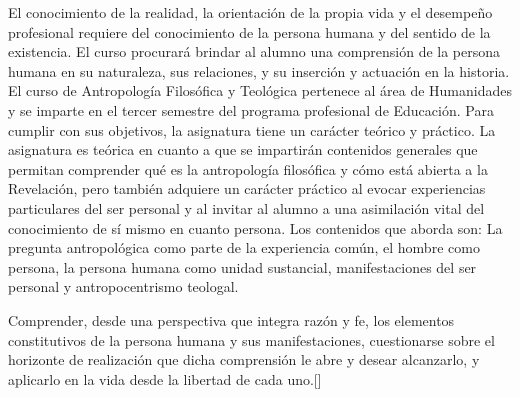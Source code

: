 \begin{syllabus}


\begin{justification}
El conocimiento de la realidad, la orientación de la propia vida y el desempeño profesional requiere del conocimiento de la persona humana y del sentido de la existencia. El curso procurará brindar al alumno una comprensión de la persona humana en su naturaleza, sus relaciones, y su inserción y actuación en la historia.
El curso de Antropología Filosófica y Teológica pertenece al área de Humanidades y se imparte en el tercer semestre del programa profesional de Educación. Para cumplir con sus objetivos, la asignatura tiene un carácter teórico y práctico. La asignatura es teórica en cuanto a que se impartirán contenidos generales que permitan comprender qué es la antropología filosófica y cómo está abierta a la Revelación, pero también adquiere un carácter práctico al evocar experiencias particulares del ser personal y al invitar al alumno a una asimilación vital del conocimiento de sí­ mismo en cuanto persona. Los contenidos que aborda son: La pregunta antropológica como parte de la experiencia común, el hombre como persona, la persona humana como unidad sustancial, manifestaciones del ser personal y antropocentrismo teologal.
\end{justification}

\begin{goals}
\item Comprender, desde una perspectiva que integra razón y fe, los elementos constitutivos de la persona humana y sus manifestaciones, cuestionarse sobre el horizonte de realización que dicha comprensión le abre y desear alcanzarlo, y aplicarlo en la vida desde la libertad de cada uno.[\Usage]
\end{goals}

\begin{outcomes}
    \item {}
    \item {}
    \item {}
\end{outcomes}
\begin{competences}
    \item {}
    \item {}
	\item {}
\end{competences}


\end{syllabus}
